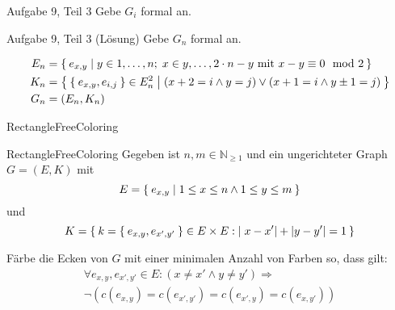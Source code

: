 \begin{frame}{Aufgabe 9, Teil 3}
Gebe $G_i$ formal an.

\begin{gallery}
\end{gallery}
\end{frame}

\begin{frame}{Aufgabe 9, Teil 3 (Lösung)}
Gebe $G_n$ formal an.

\begin{gallery}
\end{gallery}

\begin{align*}
    E_n &= \Set{e_{x,y} | y \in 1, \dots, n;\; x \in y, \dots, 2 \cdot n - y \text{ mit } x-y \equiv 0 \mod 2}\\
    K_n &= \Set{\Set{e_{x,y}, e_{i,j}} \in E_n^2 | (x+2=i \land y=j) \lor (x+1=i \land y\pm1=j)}\\
    G_n &= (E_n, K_n)
\end{align*}

\end{frame}

\begin{frame}{{\sc RectangleFreeColoring}}
    \begin{block}{{\sc RectangleFreeColoring}}
        Gegeben ist $n, m \in \mathbb{N}_{\geq 1}$ und ein 
        ungerichteter Graph $G = (E, K)$ mit 
            \[E = \Set{e_{x,y} | 1 \leq x \leq n \land 1 \leq y \leq m}\]
        und
            \[K = \Set{k=\Set{e_{x,y}, e_{x',y'}} \in E \times E : |x-x'| + |y-y'| = 1} \]
        
        Färbe die Ecken von $G$ mit einer minimalen Anzahl von Farben so, dass gilt:
		\begin{align*}
			\forall e_{x,y}, e_{x',y'} \in E: (x \neq x' \land y \neq y') \Rightarrow\\
			\neg \left (c(e_{x,y}) = c(e_{x',y'}) = c(e_{x',y}) = c(e_{x,y'}) \right )
		\end{align*}
    \end{block}
\end{frame}

